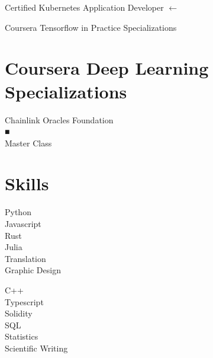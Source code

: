 \documentclass[10pt]{article}
\begin{document}
Certified Kubernetes Application Developer $\longleftarrow$

Coursera Tensorflow in Practice Specializations

\section*{Coursera Deep Learning Specializations}
Chainlink Oracles Foundation\\
■\\
Master Class

\section*{Skills}
Python\\
Javascript\\
Rust\\
Julia\\
Translation\\
Graphic Design

C++\\
Typescript\\
Solidity\\
SQL\\
Statistics\\
Scientific Writing
\end{document}
